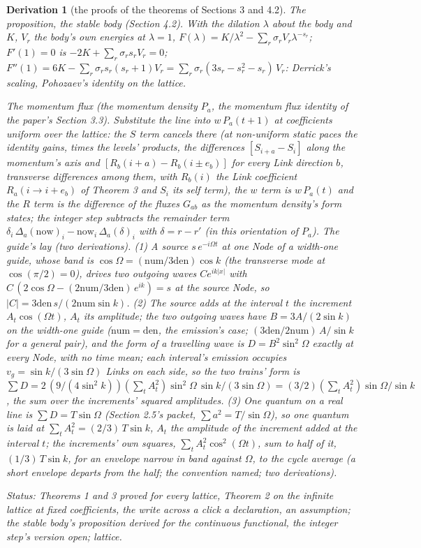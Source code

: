 \documentclass[pdflatex,sn-mathphys-num]{sn-jnl}
\newcommand{\num}{\mathrm{num}}
\newcommand{\den}{\mathrm{den}}
\theoremstyle{thmstyleone}
\newtheorem{derivation}{Derivation}
\begin{document}
\begin{derivation}[the proofs of the theorems of Sections 3 and 4.2]
\emph{The proposition, the stable body (Section 4.2).} With the dilation $\lambda$ about the body and $K$, $V_r$ the body's own energies at $\lambda = 1$, $F(\lambda) = K / \lambda^2 - \sum_r \sigma_r V_r \lambda^{-s_r}$; $F'(1) = 0$ is $-2K + \sum_r \sigma_r s_r V_r = 0$; $F''(1) = 6K - \sum_r \sigma_r s_r (s_r + 1) V_r = \sum_r \sigma_r (3s_r - s_r^2 - s_r)\,V_r$: Derrick's scaling, Pohozaev's identity on the lattice.

\emph{The momentum flux (the momentum density $P_a$, the momentum flux identity of the paper's Section 3.3).} Substitute the line into $w\,P_a(t + 1)$ at coefficients uniform over the lattice: the $S$ term cancels there (at non-uniform static paces the identity gains, times the levels' products, the differences $[S_{i+a} - S_i]$ along the momentum's axis and $[R_b(i+a) - R_b(i \pm e_b)]$ for every Link direction $b$, transverse differences among them, with $R_b(i)$ the Link coefficient $R_a(i \to i + e_b)$ of Theorem 3 and $S_i$ its self term), the $w$ term is $w\,P_a(t)$ and the $R$ term is the difference of the fluxes $G_{ab}$ as the momentum density's form states; the integer step subtracts the remainder term $\delta_i\,\Delta_a(\mathrm{now})_i - \mathrm{now}_i\,\Delta_a(\delta)_i$ with $\delta = r - r'$ (in this orientation of $P_a$).
\emph{The guide's lay (two derivations).} (1) A source $s\,e^{-i\Omega t}$ at one Node of a width-one guide, whose band is $\cos\Omega = (\num / 3\den)\cos k$ (the transverse mode at $\cos(\pi / 2) = 0$), drives two outgoing waves $C e^{ik|x|}$ with $C\,(2\cos\Omega - (2\num / 3\den)\,e^{ik}) = s$ at the source Node, so $|C| = 3\den\,s / (2\num\sin k)$. (2) The source adds at the interval $t$ the increment $A_t\cos(\Omega t)$, $A_t$ its amplitude; the two outgoing waves have $B = 3A / (2\sin k)$ on the width-one guide ($\num = \den$, the emission's case; $(3\den / 2\num)\,A / \sin k$ for a general pair), and the form of a travelling wave is $D = B^2\sin^2\Omega$ exactly at every Node, with no time mean; each interval's emission occupies $v_g = \sin k / (3\sin\Omega)$ Links on each side, so the two trains' form is $\sum D = 2\,(9 / (4\sin^2 k))(\sum_t A_t^2)\sin^2\Omega\,\sin k / (3\sin\Omega) = (3 / 2)(\sum_t A_t^2)\sin\Omega / \sin k$, the sum over the increments' squared amplitudes. (3) One quantum on a real line is $\sum D = T\sin\Omega$ (Section 2.5's packet, $\sum a^2 = T / \sin\Omega$), so one quantum is laid at $\sum_t A_t^2 = (2 / 3)\,T\sin k$, $A_t$ the amplitude of the increment added at the interval $t$; the increments' own squares, $\sum_t A_t^2\cos^2(\Omega t)$, sum to half of it, $(1 / 3)\,T\sin k$, for an envelope narrow in band against $\Omega$, to the cycle average (a short envelope departs from the half; the convention named; two derivations).

\emph{Status:} Theorems 1 and 3 proved for every lattice, Theorem 2 on the infinite lattice at fixed coefficients, the write across a click a declaration, an assumption; the stable body's proposition derived for the continuous functional, the integer step's version open; lattice.
\end{derivation}
\end{document}
